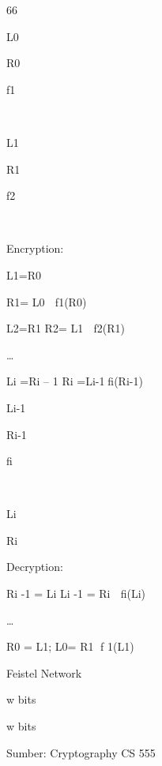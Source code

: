\documentclass{article}
\begin{document}

66

L0

R0

f1



L1

R1

f2



Encryption:

  L1=R0      

R1= L0  f1(R0)

  L2=R1         R2= L1  f2(R1)      

           … 



     Li =Ri – 1          Ri =Li-1fi(Ri-1) 

Li-1

Ri-1

fi



Li

Ri

Decryption:

   Ri -1 = Li      Li -1 = Ri  fi(Li) 


… 



R0 = L1;        L0= R1 f 1(L1) 

Feistel Network

w bits

w bits

Sumber: Cryptography CS 555
\end{document}
